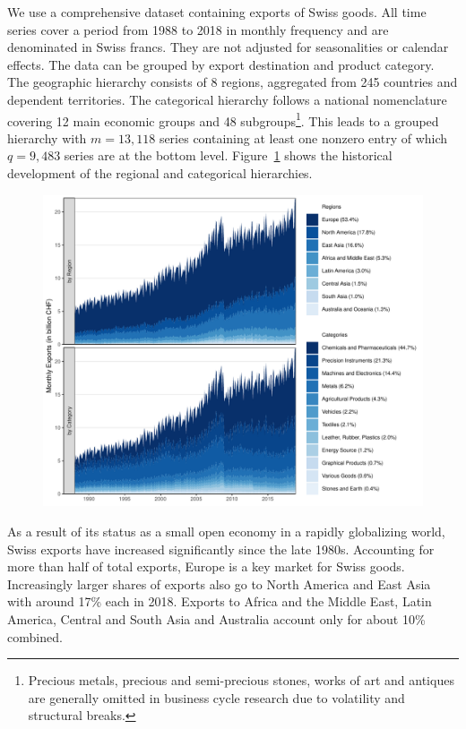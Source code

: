 \documentclass[a4paper,fleqn,11pt]{article}
\begin{document}
We use a comprehensive dataset containing exports of Swiss goods. All time series cover a period from 1988 to 2018 in monthly frequency and are denominated in Swiss francs. They are not adjusted for seasonalities or calendar effects. The data can be grouped by export destination and product category. The geographic hierarchy consists of 8 regions, aggregated from 245 countries and dependent territories. The categorical hierarchy follows a national nomenclature covering 12 main economic groups and 48 subgroups\footnote{Precious metals, precious and semi-precious stones, works of art and antiques are generally omitted in business cycle research due to volatility and structural breaks.}. This leads to a grouped hierarchy with $m = 13,118$ series containing at least one nonzero entry of which $q = 9,483$ series are at the bottom level. Figure~\ref{fig:area} shows the historical development of the regional and categorical hierarchies.

\begin{figure}[H]
	\includegraphics[width=\textwidth]{fig/fig_area}
	\label{fig:area}
\end{figure}

As a result of its status as a small open economy in a rapidly globalizing world, Swiss exports have increased significantly since the late 1980s. Accounting for more than half of total exports, Europe is a key market for Swiss goods. Increasingly larger shares of exports also go to North America and East Asia with around 17\% each in 2018. Exports to Africa and the Middle East, Latin America, Central and South Asia and Australia account only for about 10\% combined.
\end{document}
